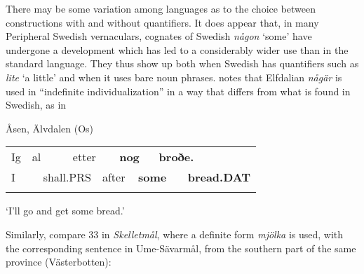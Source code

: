 \begin{styleBodyTextFirst}
There may be some variation among languages as to the choice between constructions with and without quantifiers. It does appear that, in many Peripheral Swedish vernaculars, cognates of Swedish \textit{någon} ‘some’\textit{ }have undergone a development which has led to a considerably wider use than in the standard language. They thus show up both when Swedish has quantifiers such as \textit{lite} ‘a little’ and when it uses bare noun phrases. \citet[110]{Levander1909} notes that Elfdalian \textit{någär }is used in “indefinite individualization” in a way that differs from what is found in Swedish, as in 

\end{styleBodyTextFirst}

\begin{listWWNumileveli}
\item 

\begin{styleExample}
Åsen, Älvdalen (Os)

\end{styleExample}

\end{listWWNumileveli}

\begin{tabular}{llllllllll}
\lsptoprule
Ig & \multicolumn{2}{l}{al

} & \multicolumn{2}{l}{etter

} & \multicolumn{2}{l}{{\bfseries nog}

} & \multicolumn{2}{l}{{\bfseries broðe.}

} & \\
\multicolumn{2}{l}{I

} & \multicolumn{2}{l}{shall.PRS

} & \multicolumn{2}{l}{after

} & \multicolumn{2}{l}{{\bfseries some}

} & \multicolumn{2}{l}{{\bfseries bread.DAT}

}\\
\lspbottomrule
\end{tabular}

\begin{styleTranslation}
‘I’ll go and get some bread.’ 

\end{styleTranslation}

\begin{styleBodyTextFirst}
Similarly, compare 33 in \textit{Skelletmål}, where a definite form \textit{mjölka} is used, with the corresponding sentence in Ume-Sävarmål, from the southern part of the same province (Västerbotten):

\end{styleBodyTextFirst}

